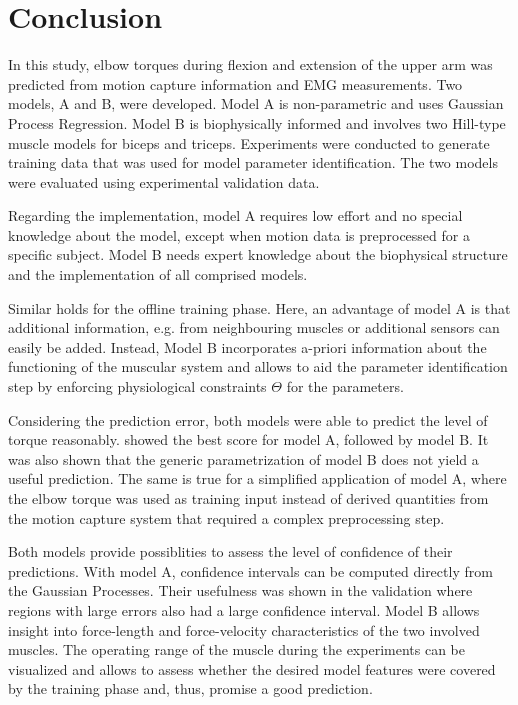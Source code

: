 \section{Conclusion}\label{sec:study_conclusion}
In this study, elbow torques during flexion and extension of the upper arm was predicted from motion capture information and EMG measurements. Two models, A and B, were developed. Model A is non-parametric and uses Gaussian Process Regression. Model B is biophysically informed and involves two Hill-type muscle models for biceps and triceps. Experiments were conducted to generate training data that was used for model parameter identification. The two models were evaluated using experimental validation data.

Regarding the implementation, model A requires low effort and no special knowledge about the model, except when motion data is preprocessed for a specific subject. Model B needs expert knowledge about the biophysical structure and the implementation of all comprised models.

Similar holds for the offline training phase. Here, an advantage of model A is that additional information, e.g. from neighbouring muscles or additional sensors can easily be added. Instead, Model B incorporates a-priori information about the functioning of the muscular system and allows to aid the parameter identification step by enforcing physiological constraints $\Theta$ for the parameters.

Considering the prediction error, both models were able to predict the level of torque reasonably. 
 showed the best score for model A, followed by model B. It was also shown that the generic parametrization of model B does not yield a useful prediction. The same is true for a simplified application of model A, where the elbow torque was used as training input instead of derived quantities from the motion capture system that required a complex preprocessing step.

Both models provide possiblities to assess the level of confidence of their predictions. With model A, confidence intervals can be computed directly from the Gaussian Processes. Their usefulness was shown in the validation where regions with large errors also had a large confidence interval. Model B allows insight into force-length and force-velocity characteristics of the two involved muscles. The operating range of the muscle during the experiments can be visualized and allows to assess whether the desired model features were covered by the training phase and, thus, promise a good prediction.

